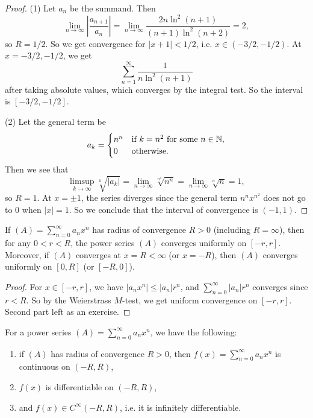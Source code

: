 \begin{proof}
  (1) Let $a_n$ be the summand. Then
  \[
    \lim_{n \to \infty} \left|\frac{a_{n + 1}}{a_n}\right|
    = \lim_{n \to \infty} \frac{2n \ln^2(n + 1)}{(n + 1)\ln^2(n + 2)}
    = 2,
  \]
  so $R = 1 / 2$. So we get convergence for
  $|x + 1| < 1 / 2$, i.e. $x \in (-3 / 2, -1 / 2)$.
  At $x = -3 / 2, -1 / 2$, we get
  \[
    \sum_{n = 1}^\infty \frac{1}{n \ln^2(n + 1)}
  \]
  after taking absolute values, which converges by
  the integral test. So the interval
  is $[-3 / 2, -1 / 2]$.

  (2) Let the general term be
  \[
    a_k =
    \begin{cases}
      n^n & \text{if $k = n^2$ for some $n \in \mathbb{N}$},\\
      0 & \text{otherwise}.
    \end{cases}
  \]
  Then we see that
  \[
    \limsup_{k \to \infty} \sqrt[k]{|a_k|}
    = \lim_{n \to \infty} \sqrt[n^2]{n^n}
    = \lim_{n \to \infty} \sqrt[n]{n} = 1,
  \]
  so $R = 1$. At $x = \pm 1$, the series diverges since
  the general term
  $n^n x^{n^2}$ does not go to $0$ when $|x| = 1$. So
  we conclude that the interval of convergence is
  $(-1, 1)$.
\end{proof}

\begin{theorem}
  If $(A) = \sum_{n = 0}^\infty a_n x^n$ has radius of
  convergence $R > 0$ (including $R = \infty$), then
  for any $0 < r < R$, the power series $(A)$ converges
  uniformly on $[-r, r]$. Moreover, if $(A)$ converges
  at $x = R < \infty$ (or $x = -R$), then $(A)$
  converges uniformly on $[0, R]$ (or $[-R, 0]$).
\end{theorem}

\begin{proof}
  For $x \in [-r, r]$, we have $|a_n x^n| \le |a_n| r^n$,
  and $\sum_{n = 0}^\infty |a_n| r^n$ converges since
  $r < R$. So by the Weierstrass $M$-test, we get
  uniform convergence on $[-r, r]$. Second part left
  as an exercise.
\end{proof}

\begin{corollary}
  \label{thm:power-series-analytic}
  For a power series $(A) = \sum_{n = 0}^\infty a_n x^n$,
  we have the following:
  \begin{enumerate}
    \item if $(A)$ has
      radius of convergence $R > 0$, then
      $f(x) = \sum_{n = 0}^\infty a_n x^n$ is continuous
      on $(-R, R)$,
    \item $f(x)$ is differentiable on $(-R, R)$,
    \item and $f(x) \in C^\infty(-R, R)$, i.e. it is
      infinitely differentiable.
  \end{enumerate}
\end{corollary}


